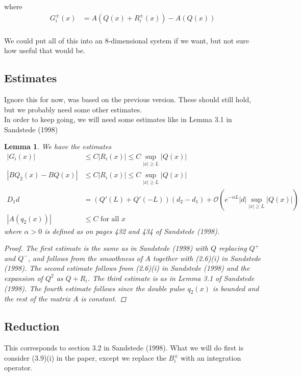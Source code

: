 \documentclass[12pt]{article}
\newtheorem{lemma}{Lemma}
\begin{document}
where
\begin{align*}
G_i^\pm(x) &= A(Q(x) + R_i^\pm(x)) - A(Q(x)) \\
\end{align*}

We could put all of this into an 8-dimensional system if we want, but not sure how useful that would be.


\subsection*{Estimates}
Ignore this for now, was based on the previous version. These should still hold, but we probably need some other estimates. \\

In order to keep going, we will need some estimates like in Lemma 3.1 in Sandstede (1998)

\begin{lemma}We have the estimates
\begin{align*}
|G_i(x)| &\leq C|R_i(x)| \leq C \sup_{|x| \geq L} |Q(x)| \\
| B Q_2(x) - B Q(x) | & \leq C |R_i(x)| \leq C \sup_{|x| \geq L} |Q(x)| \\
D_1 d &= (Q'(L) + Q'(-L))(d_2 - d_1) +\mathcal{O}\left( e^{-\alpha L} |d| \sup_{|x| \geq L} |Q(x)| \right)\\
|A(q_2(x))| &\leq C \textrm{ for all }x
\end{align*}
where $\alpha > 0$ is defined as on pages 432 and 434 of Sandstede (1998).
\begin{proof}
The first estimate is the same as in Sandstede (1998) with $Q$ replacing $Q^+$ and $Q^-$, and follows from the smoothness of $A$ together with (2.6)(i) in Sandstede (1998). The second estimate follows from (2.6)(i) in Sandstede (1998) and the expansion of $Q^2$ as $Q + R_i$. The third estimate is as in Lemma 3.1 of Sandstede (1998). The fourth estimate follows since the double pulse $q_2(x)$ is bounded and the rest of the matrix $A$ is constant.
\end{proof}
\end{lemma}

\subsection*{Reduction}
This corresponds to section 3.2 in Sandstede (1998). What we will do first is consider (3.9)(i) in the paper, except we replace the $B_i^\pm$ with an integration operator.\\
\end{document}
